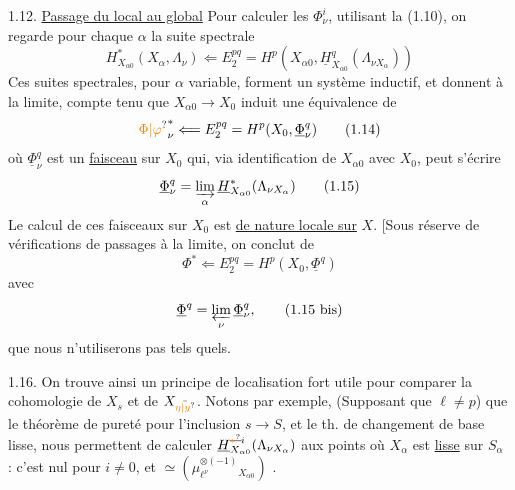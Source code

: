 1.12. \uline{Passage du local au global} Pour calculer les $\Phi^i_\nu$,  utilisant la  (1.10), on regarde pour chaque $\alpha$ la suite spectrale
\[
H^*_{X_{\alpha0}}(X_\alpha,\Lambda_\nu)\Longleftarrow E_2^{pq}=H^p(X_{\alpha0},\underline H^q_{X_{\alpha0}}(\Lambda_{\nu X_\alpha}))
\tag*{(1.13)}
\]
Ces suites spectrales, pour $\alpha$ variable, forment un système inductif, et donnent à la limite, compte tenu que $X_{\alpha0}\longrightarrow X_0$ induit une équivalence de 
\[
{\unsure{\Phi|\varphi}}^*_\nu\Longleftarrow E_2^{pq}=H^p(X_0,\underline\Phi^q_\nu)
\tag*{(1.14)}
\]
où $\underline\Phi^q_\nu$ est un \uline{faisceau} sur $X_0$ qui, via identification de $X_{\alpha0}$ avec $X_0$, peut s'écrire
\[
\underline\Phi^q_\nu=\varinjlim_\alpha\underline H^*_{X_{\alpha0}}(\Lambda_{\nu X_\alpha})
\tag*{(1.15)}
\]
Le calcul de ces faisceaux sur $X_0$ est \uline{de nature locale sur} $X$. [Sous réserve  de vérifications de passages à la limite, on conclut de 
\[
\Phi^*\Longleftarrow E_2^{pq}=H^p(X_0,\underline\Phi^q)
\tag*{(1.14 bis)}
\]
avec
\[
\underline\Phi^q=\varprojlim_\nu\underline\Phi^q_\nu,
\tag*{(1.15 bis)}
\]
 que nous n'utiliserons pas tels quels.\deleted{]}

1.16. On trouve ainsi un principe de localisation fort utile pour comparer la cohomologie de $X_s$ et de $X_{\bar{\unsure{\eta|y}}}$. Notons par exemple,  (Supposant que $\ell\ne p$) que  le théorème de pureté pour l'inclusion $s\longrightarrow S$, et le th. de changement de base lisse, nous permettent de calculer $\underline H^{\deleted{\unsure{*}}i}_{X_{\alpha0}}(\Lambda_{\nu X_\alpha})$ aux points où $X_\alpha$ est \uline{lisse} sur $S_\alpha$ : c'est nul pour $i\ne0$, et \deleted{\unsure{\simeq}} $\simeq(\mu_{\ell^\nu}^{\otimes(-1)}{}_{X_{\alpha0}})$ .

